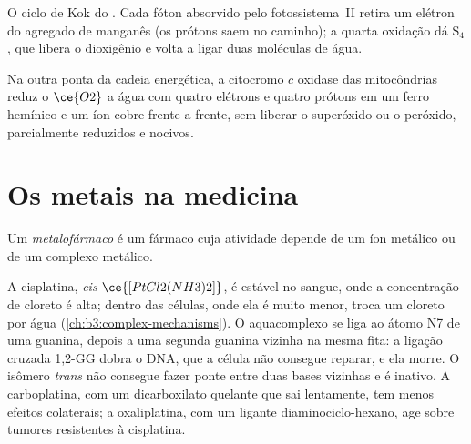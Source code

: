\begin{omfigure}

{\small O ciclo de Kok do . Cada fóton absorvido pelo
fotossistema~II retira um elétron do agregado de manganês (os prótons
saem no caminho); a quarta oxidação dá $\mathrm S_4$, que libera o dioxigênio e
volta a ligar duas moléculas de água.}
\end{omfigure}

Na outra ponta da cadeia energética, a citocromo $c$ oxidase das
mitocôndrias reduz o $\ce{O2}$ a água com quatro elétrons e quatro prótons em um
ferro hemínico e um íon cobre frente a frente, sem liberar o superóxido ou o peróxido,
parcialmente reduzidos e nocivos.

\section{Os metais na medicina}

\begin{definition}[Metalofármacos]\label{def:b3:bioinorganic:metallodrug}
Um \emph{metalofármaco} é um fármaco cuja atividade depende de um
íon metálico ou de um complexo metálico.
\end{definition}

A cisplatina, \textit{cis}-$\ce{[PtCl2(NH3)2]}$, é estável no sangue, onde a concentração de cloreto é
alta; dentro das células, onde ela é muito menor, troca um cloreto por água
(\cref{ch:b3:complex-mechanisms}). O aquacomplexo se liga ao átomo N7 de uma
guanina, depois a uma segunda guanina vizinha na mesma fita: a ligação cruzada
1,2-GG dobra o DNA, que a célula não consegue reparar, e ela morre. O
isômero \textit{trans} não consegue fazer ponte entre duas bases vizinhas e é inativo.
A carboplatina, com um dicarboxilato quelante que sai lentamente, tem menos
efeitos colaterais; a oxaliplatina, com um ligante diaminociclo-hexano, age sobre tumores
resistentes à cisplatina.

